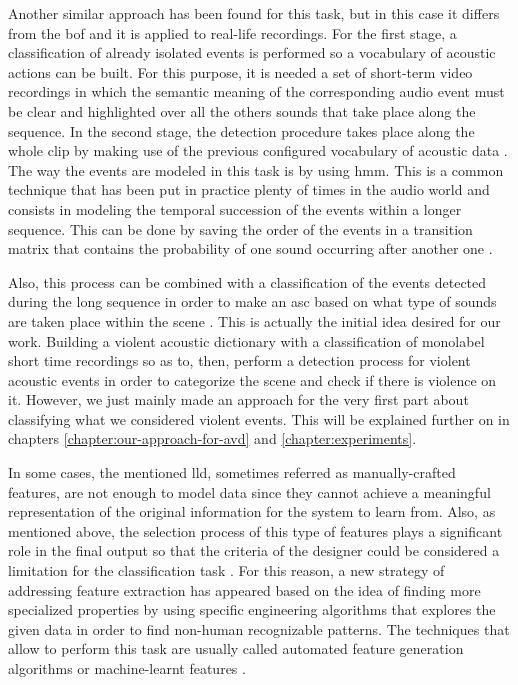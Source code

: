 	Another similar approach has been found for this task, but in this case it differs from the \acrshort{bof} and it is applied to real-life recordings. For the first stage, a classification of already isolated events is performed so a vocabulary of acoustic actions can be built. For this purpose, it is needed a set of short-term video recordings in which the semantic meaning of the corresponding audio event must be clear and highlighted over all the others sounds that take place along the sequence. In the second stage, the detection procedure takes place along the whole clip by making use of the previous configured vocabulary of acoustic data \cite{Mesaros2010}. The way the events are modeled in this task is by using \acrfull{hmm}. This is a common technique that has been put in practice plenty of times in the audio world and consists in modeling the temporal succession of the events within a longer sequence. This can be done by saving the order of the events in a transition matrix that contains the probability of one sound occurring after another one \cite{Barchiesi2015}.
	
	Also, this process can be combined with a classification of the events detected during the long sequence in order to make an \acrshort{asc} based on what type of sounds are taken place within the scene \cite{Barchiesi2015}. This is actually the initial idea desired for our work. Building a violent acoustic dictionary with a classification of monolabel short time recordings so as to, then, perform a detection process for violent acoustic events in order to categorize the scene and check if there is violence on it. However, we just mainly made an approach for the very first part about classifying what we considered violent events. This will be explained further on in chapters \ref{chapter:our-approach-for-avd} and \ref{chapter:experiments}.
	
	In some cases, the mentioned \acrlong{lld}, sometimes referred as manually-crafted features, are not enough to model data since they cannot achieve a meaningful representation of the original information for the system to learn from. Also, as mentioned above, the selection process of this type of features plays a significant role in the final output so that the criteria of the designer could be considered a limitation for the classification task \cite{Grill2012}. For this reason, a new strategy of addressing feature extraction has appeared based on the idea of finding more specialized properties by using specific engineering algorithms that explores the given data in order to find non-human recognizable patterns. The techniques that allow to perform this task are usually called automated feature generation algorithms or machine-learnt features \cite{Pachet2009}.
	
